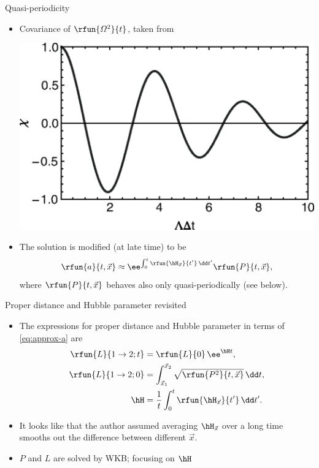 \documentclass{beamer}
\begin{document}
\begin{frame}{Quasi-periodicity}
\begin{itemize}
\item Covariance of $\rfun{\varOmega^2}{t}$, taken from \cite{Wang2017}
\begin{center}
\includegraphics[width=.6\linewidth]{./graphics/FIG.2.png}
\end{center}
\item The solution is modified (at late time) to be
\begin{equation}
\rfun{a}{t,\vec x} \approx \ee^{\int_0^t \rfun{\hH_{\vec x}}{t'}\,\dd t'}
\rfun{P}{t,\vec x},
\label{eq:approx-a}
\end{equation}
where $\rfun{P}{t,\vec x}$ behaves also only quasi-periodically (see below).

\end{itemize}

\end{frame}

\begin{frame}{Proper distance and Hubble parameter revisited}
\begin{itemize}
\item The expressions for proper distance and Hubble parameter in terms of 
\cref{eq:approx-a} are
\begin{align}
\rfun{L}{1 \to 2; t} &= \rfun{L}{0}\,\ee^{\hH t},\\
\rfun{L}{1 \to 2; 0} &= \int_{\vec x_1}^{\vec x_2} \sqrt{\rfun{P^2}{t,\vec 
x}}\,\dd t,\\
\hH &= \frac{1}{t} \int_0^t \rfun{\hH_{\vec x}}{t'}\,\dd t'.
\end{align}
\item It looks like that the author assumed averaging $\hH_{\vec x}$ over a 
long time smooths out the difference between different $\vec x$.

\item $P$ and $L$ are solved by WKB; focusing on $\hH$
\end{itemize}

\end{frame}
\end{document}

